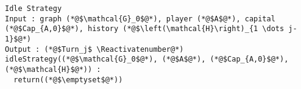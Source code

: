 {}
\Suppressnumber
\begin{lstlisting}[label=idlestrategy, style=numbers]
Idle Strategy
Input : graph (*@$\mathcal{G}_0$@*), player (*@$A$@*), capital (*@$Cap_{A,0}$@*), history (*@$\left(\mathcal{H}\right)_{1 \dots j-1}$@*)
Output : (*@$Turn_j$ \Reactivatenumber@*)
idleStrategy((*@$\mathcal{G}_0$@*), (*@$A$@*), (*@$Cap_{A,0}$@*), (*@$\mathcal{H}$@*)) :
  return((*@$\emptyset$@*))
\end{lstlisting}
